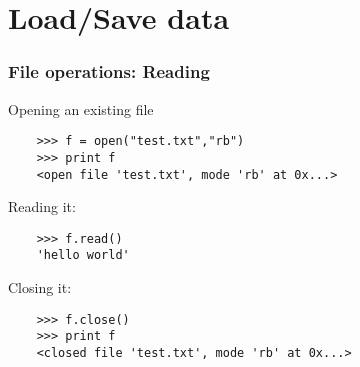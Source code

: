 






\section{Load/Save data}

\begin{frame}[fragile]

  \frametitle{File operations: Reading}

  Opening an existing file 

  \begin{verbatim}
    >>> f = open("test.txt","rb")
    >>> print f
    <open file 'test.txt', mode 'rb' at 0x...>
  \end{verbatim}
  \bigskip
  \pause
  Reading it:
  \begin{verbatim}
    >>> f.read()
    'hello world'
  \end{verbatim}
  \pause
  \bigskip
  Closing it:
  \begin{verbatim}
    >>> f.close()
    >>> print f
    <closed file 'test.txt', mode 'rb' at 0x...>
  \end{verbatim}

\end{frame}


